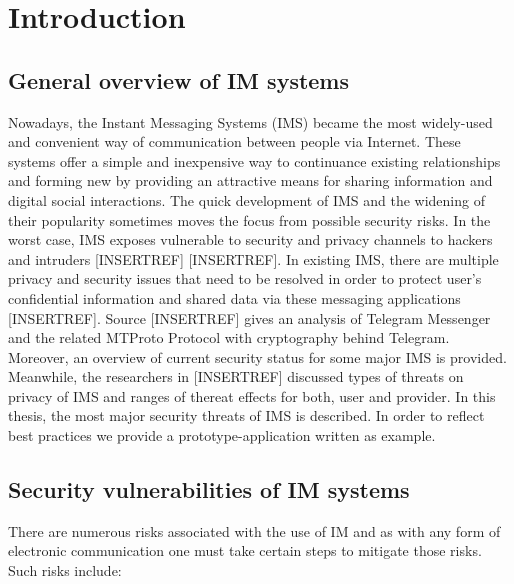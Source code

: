 \chapter{Introduction}\label{ch:introduction}


\newcommand{\keyword}[1]{\textbf{#1}}
\newcommand{\tabhead}[1]{\textbf{#1}}
\newcommand{\code}[1]{\texttt{#1}}
\newcommand{\file}[1]{\texttt{\bfseries#1}}
\newcommand{\option}[1]{\texttt{\itshape#1}}



\section{General overview of IM systems}\label{sec:general-overview-of-im-system}
Nowadays, the Instant Messaging Systems (IMS) became the most widely-used and convenient way of communication between
people via Internet.
These systems offer a simple and inexpensive way to continuance existing relationships and forming new by providing an
attractive means for sharing information and digital social interactions.
The quick development of IMS and the widening of their popularity sometimes moves the focus from possible security risks.
In the worst case, IMS exposes vulnerable to security and privacy channels to hackers and intruders [INSERTREF] [INSERTREF].
In existing IMS, there are multiple privacy and security issues that need to be resolved in order to protect user's confidential
information and shared data via these messaging applications [INSERTREF].
Source [INSERTREF] gives an analysis of Telegram Messenger and the related MTProto Protocol with cryptography
behind Telegram.
Moreover, an overview of current security status for some major IMS is provided.
Meanwhile, the researchers in [INSERTREF] discussed types of threats on privacy of IMS and ranges of thereat effects for both,
user and provider.
In this thesis, the most major security threats of IMS is described.
In order to reflect best practices we provide a prototype-application written as example.


\section{Security vulnerabilities of IM systems}\label{sec:security-vulnerabilities-of-im-systems}
There are numerous risks associated with the use of IM and as with any form of electronic communication one must take
certain steps to mitigate those risks.
Such risks include:

